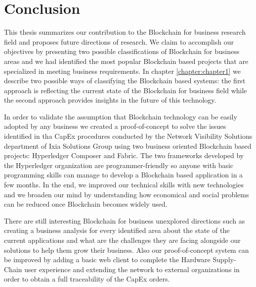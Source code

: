 \chapter{Conclusion}
\label{chapter:conclusion}

This thesis summarizes our contribution to the Blockchain for business research field and proposes future directions of research.
We claim to accomplish our objectives by presenting two possible classifications of Blockchain for business areas and we had identified the most popular Blockchain based projects that are specialized in meeting business requirements.
In chapter \ref{chapter:chapter1} we describe two possible ways of classifying the Blockchain based systems: the first approach is reflecting the current state of the Blockchain for business field while the second approach provides insights in the future of this technology.

In order to validate the assumption that Blockchain technology can be easily adopted by any business we created a proof-of-concept to solve the issues identified in tha CapEx procedures conducted by the Network Visibility Solutions department of Ixia Solutions Group using two business oriented Blockchain based projects: Hyperledger Composer and Fabric. The two frameworks developed by the Hyperledger organization are programmer-friendly so anyone with basic programming skills can manage to develop a Blockchain based application in a few months. In the end, we improved our technical skills with new technologies and we broaden our mind by understanding how economical and social problems can be reduced once Blockchain becomes widely used.

There are still interesting Blockchain for business unexplored directions such as creating a business analysis for every identified area about the state of the current applications and what are the challenges they are facing alongside our solutions to help them grow their business.
Also our proof-of-concept system can be improved by adding a basic web client to complete the Hardware Supply-Chain user experience and extending the network to external organizations in order to obtain a full traceability of the CapEx orders.